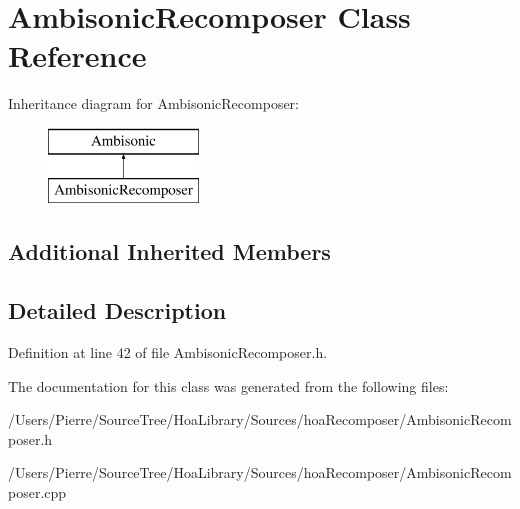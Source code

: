 \hypertarget{class_ambisonic_recomposer}{\section{Ambisonic\-Recomposer Class Reference}
\label{class_ambisonic_recomposer}
}
Inheritance diagram for Ambisonic\-Recomposer\-:\begin{figure}[H]
\begin{center}
\leavevmode
\includegraphics[height=2.000000cm]{class_ambisonic_recomposer}
\end{center}
\end{figure}
\subsection*{Additional Inherited Members}


\subsection{Detailed Description}


Definition at line 42 of file Ambisonic\-Recomposer.\-h.



The documentation for this class was generated from the following files\-:\begin{DoxyCompactItemize}
\item 
/\-Users/\-Pierre/\-Source\-Tree/\-Hoa\-Library/\-Sources/hoa\-Recomposer/Ambisonic\-Recomposer.\-h\item 
/\-Users/\-Pierre/\-Source\-Tree/\-Hoa\-Library/\-Sources/hoa\-Recomposer/Ambisonic\-Recomposer.\-cpp\end{DoxyCompactItemize}
